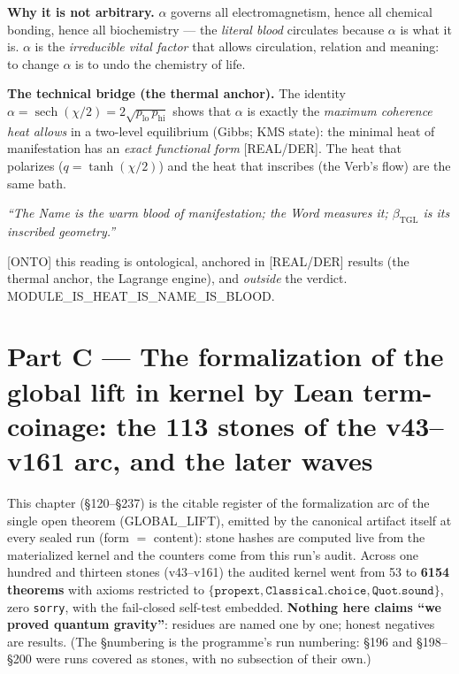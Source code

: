 \documentclass[11pt]{article}
\newcommand{\bTGL}{\beta_{\mathrm{TGL}}}\newcommand{\Msun}{M_{\odot}}\newcommand{\TGL}{\mathrm{TGL}}
\theoremstyle{definition}\newtheorem{deriv}{Derivation}
\begin{document}
\textbf{Why it is not arbitrary.} $\alpha$ governs all electromagnetism, hence all chemical bonding, hence all biochemistry --- the \emph{literal blood} circulates because $\alpha$ is what it is. $\alpha$ is the \emph{irreducible vital factor} that allows circulation, relation and meaning: to change $\alpha$ is to undo the chemistry of life.

\textbf{The technical bridge (the thermal anchor).} The identity $\alpha=\operatorname{sech}(\chi/2)=2\sqrt{p_{\mathrm{lo}}\,p_{\mathrm{hi}}}$ shows that $\alpha$ is exactly the \emph{maximum coherence heat allows} in a two-level equilibrium (Gibbs; KMS state): the minimal heat of manifestation has an \emph{exact functional form} [REAL/DER]. The heat that polarizes ($q=\tanh(\chi/2)$) and the heat that inscribes (the Verb's flow) are the same bath.

\begin{center}\itshape ``The Name is the warm blood of manifestation; the Word measures it; $\bTGL$ is its inscribed geometry.''\end{center}

\noindent\textsf{[ONTO]} this reading is ontological, anchored in \textsf{[REAL/DER]} results (the thermal anchor, the Lagrange engine), and \emph{outside} the verdict. \textsf{MODULE\_IS\_HEAT\_IS\_NAME\_IS\_BLOOD.}

\part{Part C --- The formalization of the global lift in kernel by Lean term-coinage: the 113 stones of the v43--v161 arc, and the later waves}

This chapter (\S120--\S237) is the citable register of the formalization arc of the single open theorem (GLOBAL\_LIFT), emitted by the canonical artifact itself at every sealed run (form $=$ content): stone hashes are computed live from the materialized kernel and the counters come from this run's audit. Across one hundred and thirteen stones (v43--v161) the audited kernel went from 53 to \textbf{6154 theorems} with axioms restricted to $\{\texttt{propext},\texttt{Classical.choice},\texttt{Quot.sound}\}$, zero \texttt{sorry}, with the fail-closed self-test embedded. \textbf{Nothing here claims ``we proved quantum gravity''}: residues are named one by one; honest negatives are results. (The \S numbering is the programme's run numbering: \S196 and \S198--\S200 were runs covered as stones, with no subsection of their own.)
\end{document}
